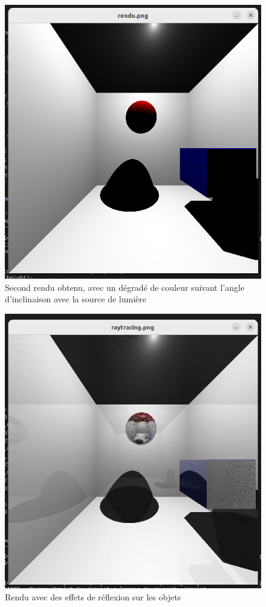 \documentclass[a4paper,oneside,12pt,titlepage]{article}
\begin{document}
\begin{sloppypar}
\begin{figure}[!h]
    \centering
    \includegraphics[width=\linewidth]{./deuxieme_rendu.png}
    \caption{Second rendu obtenu, avec un dégradé de couleur suivant l'angle d'inclinaison avec la source de lumière}
    \label{fig:fig_rendu2}
\end{figure}

\begin{figure}[!h]
    \centering
    \includegraphics[width=\linewidth]{./rendu_reflexions.png}
    \caption{Rendu avec des effets de réflexion sur les objets}
    \label{fig:fig_rendu3}
\end{figure}


\end{sloppypar}
\end{document}

